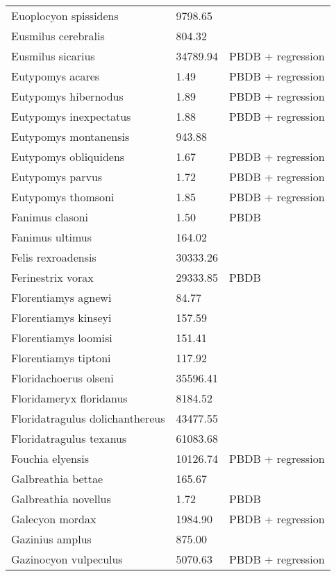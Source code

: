 \documentclass{article}
\begin{document}
\begin{center}
\begin{longtable}{p{} p{} p{}}
    Euoplocyon spissidens & 9798.65 & \cite{Tomiya2013} \\ 
    Eusmilus cerebralis & 804.32 & \cite{Tomiya2013} \\ 
    Eusmilus sicarius & 34789.94 & PBDB + regression \\ 
    Eutypomys acares & 1.49 & PBDB + regression \\ 
    Eutypomys hibernodus & 1.89 & PBDB + regression \\ 
    Eutypomys inexpectatus & 1.88 & PBDB + regression \\ 
    Eutypomys montanensis & 943.88 & \cite{Tomiya2013} \\ 
    Eutypomys obliquidens & 1.67 & PBDB + regression \\ 
    Eutypomys parvus & 1.72 & PBDB + regression \\ 
    Eutypomys thomsoni & 1.85 & PBDB + regression \\ 
    Fanimus clasoni & 1.50 & PBDB \\ 
    Fanimus ultimus & 164.02 & \cite{Tomiya2013} \\ 
    Felis rexroadensis & 30333.26 & \cite{Tomiya2013} \\ 
    Ferinestrix vorax & 29333.85 & PBDB \\ 
    Florentiamys agnewi & 84.77 & \cite{Tomiya2013} \\ 
    Florentiamys kinseyi & 157.59 & \cite{Tomiya2013} \\ 
    Florentiamys loomisi & 151.41 & \cite{Tomiya2013} \\ 
    Florentiamys tiptoni & 117.92 & \cite{Tomiya2013} \\ 
    Floridachoerus olseni & 35596.41 & \cite{Tomiya2013} \\ 
    Floridameryx floridanus & 8184.52 & \cite{Tomiya2013} \\ 
    Floridatragulus dolichanthereus & 43477.55 & \cite{Tomiya2013} \\ 
    Floridatragulus texanus & 61083.68 & \cite{Tomiya2013} \\ 
    Fouchia elyensis & 10126.74 & PBDB + regression \\ 
    Galbreathia bettae & 165.67 & \cite{Tomiya2013} \\ 
    Galbreathia novellus & 1.72 & PBDB \\ 
    Galecyon mordax & 1984.90 & PBDB + regression \\ 
    Gazinius amplus & 875.00 & \cite{Soligo2006} \\ 
    Gazinocyon vulpeculus & 5070.63 & PBDB + regression \\ 

\end{longtable}
\end{center}
\end{document}
